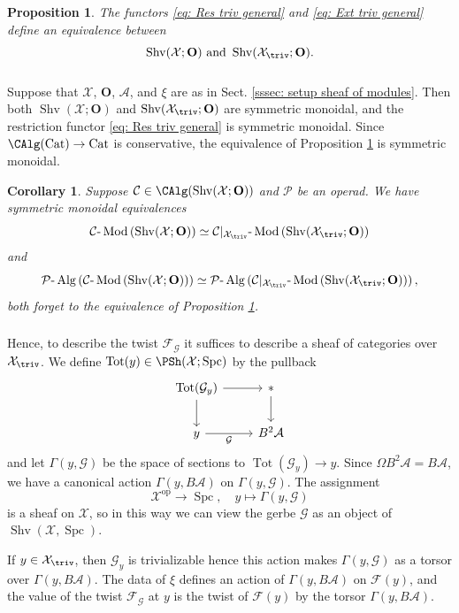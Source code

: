 \documentclass[10pt]{amsart}
\newcommand{\sssec}{\subsubsection}
\newtheorem{prop}[subsubsection]{Proposition}
\newtheorem{cor}[subsubsection]{Corollary}
\theoremstyle{remark}
\newcommand{\te}{\text}
\newcommand{\cP}{\mathcal{P}}
\newcommand{\on}{\operatorname}
\newcommand{\cA}{\mathcal{A}}
\newcommand{\cC}{\mathcal{C}}
\newcommand{\cF}{\mathcal{F}}
\newcommand{\cG}{\mathcal{G}}
\newcommand{\cX}{\mathcal{X}}
\newcommand{\Cat}{\on{Cat}}
\newcommand{\lMod}{\text{-}\on{Mod}}
\newcommand{\lAlg}{\text{-}\on{Alg}}
\newcommand{\Shv}{\on{Shv}}
\newcommand{\Spc}{\on{Spc}}
\DeclareMathOperator{\op}{op}
\newcommand{\bO}{\mathbf{O}}
\begin{document}
\begin{prop}\label{prop: sheaf on whole vs triv}
    The functors \eqref{eq: Res triv general} and \eqref{eq: Ext triv general} define an equivalence between
    \[\Shv(\cX;\bO) \te{ and } \Shv(\cX_{\triv};\bO).\]
\end{prop}

\sssec{}
Suppose that $\cX$, $\bO$, $\cA$, and $\xi$ are as in Sect. \ref{sssec: setup sheaf of modules}. Then both $\Shv(\cX;\bO)$ and $\Shv(\cX_{\triv};\bO)$ are symmetric monoidal, and the restriction functor \eqref{eq: Res triv general} is symmetric monoidal. Since $\CAlg(\Cat)\rightarrow\Cat$ is conservative, the equivalence of Proposition \ref{prop: sheaf on whole vs triv} is symmetric monoidal. 
\begin{cor}
Suppose $\cC\in\CAlg(\Shv(\cX;\bO))$ and $\cP$ be an operad.
    We have symmetric monoidal equivalences
    \[\cC\lMod\left(\Shv(\cX;\bO)\right)\simeq \cC|_{\cX_{\triv}}\lMod\left(\Shv(\cX_{\triv};\bO)\right)\]
    and
    \[\cP\lAlg\left(\cC\lMod\left(\Shv(\cX;\bO)\right)\right)\simeq \cP\lAlg\left(\cC|_{\cX_{\triv}}\lMod\left(\Shv(\cX_{\triv};\bO)\right)\right),\]
    both forget to the equivalence of Proposition \ref{prop: sheaf on whole vs triv}.
\end{cor}


\sssec{}\label{sssec: sheaf from a gerbe}
Hence, to describe the twist $\cF_{\cG}$ it suffices to describe a sheaf of categories over $\cX_{\triv}$. We define $\on{Tot}(y)\in \PSh(\cX;\Spc)$ by the pullback
\[\begin{tikzcd}
	{\on{Tot}(\cG_y)} & \ast \\
	y & {B^2\cA}
	\arrow[from=1-1, to=1-2]
	\arrow[from=1-1, to=2-1]
	\arrow[from=1-2, to=2-2]
	\arrow["\cG"', from=2-1, to=2-2]
\end{tikzcd}\]
and let $\Gamma(y,\cG)$ be the space of sections to $\on{Tot}(\cG_y)\rightarrow y$. Since $\Omega  B^2\cA = B\cA$, we have a canonical action $\Gamma(y,B\cA)$ on $\Gamma(y,\cG)$. The assignment 
\[\cX^{\op}\rightarrow \Spc,\quad y\mapsto \Gamma(y,\cG)\] is a sheaf on $\cX$, so in this way we can view the gerbe $\cG$ as an object of $\Shv(\cX,\Spc)$.
\medskip

If $y\in \cX_{\triv}$, then $\cG_y$ is trivializable hence this action makes $\Gamma(y,\cG)$ as a torsor over $\Gamma(y,B\cA)$. The data of $\xi$ defines an action of $\Gamma(y,B\cA)$ on $\cF(y)$, and the value of the twist $\cF_{\cG}$ at $y$ is the twist of $\cF(y)$ by the torsor $\Gamma(y,B\cA)$.
\end{document}
